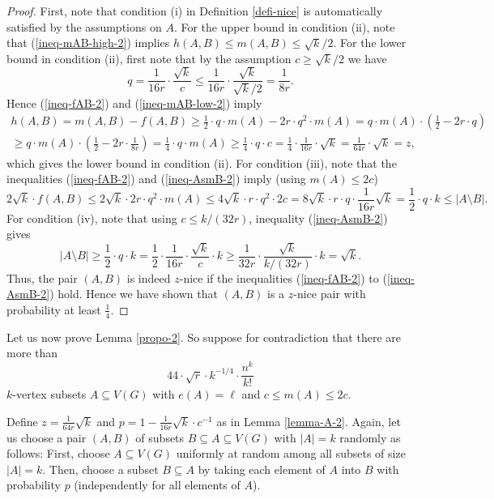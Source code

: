 \documentclass[11pt]{article}
\theoremstyle{definition}
\numberwithin{equation}{section}
\begin{document}
\begin{proof}
First, note that condition (i) in Definition \ref{defi-nice} is automatically satisfied by the assumptions on $A$. For the upper bound in condition (ii), note that  (\ref{ineq-mAB-high-2}) implies $h(A,B)\leq m(A,B)\leq \sqrt{k}/2$. For the lower bound in condition (ii), first note that by the assumption $c\geq \sqrt{k}/2$ we have
\[q=\frac{1}{16r}\cdot \frac{\sqrt{k}}{c}\leq \frac{1}{16r}\cdot \frac{\sqrt{k}}{\sqrt{k}/2}=\frac{1}{8r}.\]
Hence (\ref{ineq-fAB-2}) and (\ref{ineq-mAB-low-2}) imply
\begin{multline*}
h(A,B)=m(A,B)-f(A,B)\geq \frac{1}{2}\cdot q \cdot m(A)-2r\cdot q^2 \cdot m(A)=q\cdot m(A)\cdot \left(\frac{1}{2}-2r\cdot q\right)\\
\geq q\cdot m(A)\cdot \left(\frac{1}{2}-2r\cdot \frac{1}{8r}\right)=\frac{1}{4}\cdot q\cdot m(A)\geq \frac{1}{4}\cdot q\cdot c=\frac{1}{4}\cdot\frac{1}{16r}\cdot \sqrt{k}=\frac{1}{64r}\cdot \sqrt{k}=z,
\end{multline*}
which gives the lower bound in condition (ii). For condition (iii), note that the inequalities (\ref{ineq-fAB-2}) and (\ref{ineq-AsmB-2}) imply (using $m(A)\leq 2c$)
\[2\sqrt{k}\cdot f(A,B)\leq 2\sqrt{k}\cdot 2r\cdot q^2 \cdot m(A)\leq 4\sqrt{k}\cdot r\cdot q^2 \cdot 2c
=8\sqrt{k}\cdot r\cdot q \cdot \frac{1}{16r}\sqrt{k}=\frac{1}{2}\cdot q \cdot k\leq \vert A\setminus B\vert.\]
For condition (iv), note that using $c\leq k/(32r)$, inequality (\ref{ineq-AsmB-2}) gives
\[\vert A\setminus B\vert\geq \frac{1}{2}\cdot q\cdot k=\frac{1}{2}\cdot \frac{1}{16r}\cdot \frac{\sqrt{k}}{c}\cdot k\geq\frac{1}{32r}\cdot \frac{\sqrt{k}}{k/(32r)}\cdot k =\sqrt{k}.\]
Thus, the pair $(A,B)$ is indeed $z$-nice if the inequalities (\ref{ineq-fAB-2}) to (\ref{ineq-AsmB-2}) hold. Hence we have shown that $(A,B)$ is a $z$-nice pair with probability at least $\frac{1}{4}$.
\end{proof}

Let us now prove Lemma \ref{propo-2}. So suppose for contradiction that there are more than
\[44\cdot \sqrt{r}\cdot k^{-1/4}\cdot \frac{n^k}{k!}\]
$k$-vertex subsets $A\subseteq V(G)$ with $e(A)=\ell$ and $c\leq m(A)\leq 2c$. 

Define $z=\frac{1}{64r}\sqrt{k}$ and $p=1-\frac{1}{16r}\sqrt{k}\cdot c^{-1}$ as in Lemma \ref{lemma-A-2}. Again, let us choose a pair $(A,B)$ of subsets $B\subseteq A\subseteq V(G)$ with $\vert A\vert=k$ randomly as follows: First, choose $A\subseteq V(G)$ uniformly at random among all subsets of size $\vert A\vert=k$. Then, choose a subset $B\subseteq A$ by taking each element of $A$ into $B$ with probability $p$ (independently for all elements of $A$).
\end{document}
